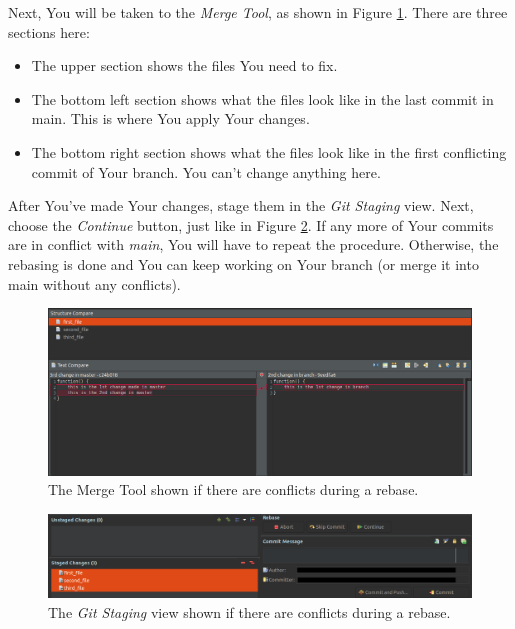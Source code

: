 \documentclass{article}
\begin{document}
Next, You will be taken to the \textit{Merge Tool}, as shown in Figure \ref{fig:rebase_merge_tool}. There are three sections here:
\begin{itemize}
    \item The upper section shows the files You need to fix.
    \item The bottom left section shows what the files look like in the last commit in main. This is where You apply Your changes.
    \item The bottom right section shows what the files look like in the first conflicting commit of Your branch. You can't change anything here.
\end{itemize}

After You've made Your changes, stage them in the \textit{Git Staging} view. Next, choose the \textit{Continue} button, just like in Figure \ref{fig:rebase_continue}. If any more of Your commits are in conflict with \textit{main}, You will have to repeat the procedure. Otherwise, the rebasing is done and You can keep working on Your branch (or merge it into main without any conflicts).

\begin{figure}[h]
    \centering
    \includegraphics[scale=0.27]{rebase_merge_tool.png}
    \caption{The Merge Tool shown if there are conflicts during a rebase.}
    \label{fig:rebase_merge_tool}
\end{figure}

\begin{figure}[h]
    \centering
    \includegraphics[scale=0.27]{rebase_continue.png}
    \caption{The \textit{Git Staging} view shown if there are conflicts during a rebase.}
    \label{fig:rebase_continue}
\end{figure}
\end{document}
